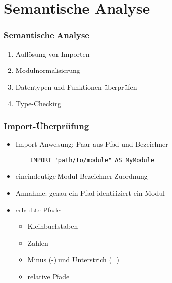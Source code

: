 \section{Semantische Analyse}

\begin{frame}
\frametitle{Semantische Analyse}

\begin{enumerate}
\item Auflösung von Importen
\item Modulnormalisierung
\item Datentypen und Funktionen überprüfen
\item Type-Checking
\end{enumerate}

\end{frame}


\begin{frame}[containsverbatim=true]
\frametitle{Import-Überprüfung}

\begin{itemize}
\item Import-Anweisung: Paar aus Pfad und Bezeichner
	\begin{verbatim}
	IMPORT "path/to/module" AS MyModule
	\end{verbatim}
\item eineindeutige Modul-Bezeichner-Zuordnung
\item Annahme: genau ein Pfad identifiziert ein Modul
\item erlaubte Pfade:
	\begin{itemize}
	\item Kleinbuchstaben
	\item Zahlen
	\item Minus (-) und Unterstrich (\_)
	\item relative Pfade
	\end{itemize}
\end{itemize}

\end{frame}


